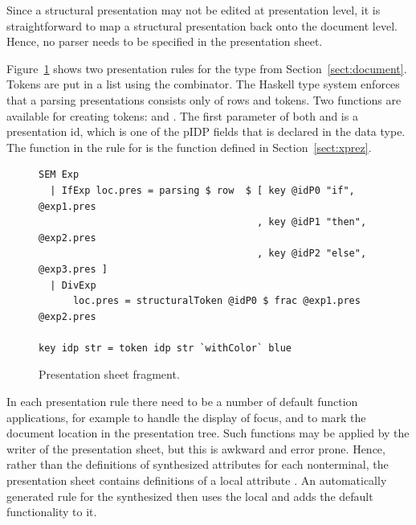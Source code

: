 \documentclass[12pt]{article}
\begin{document}
Since a structural presentation may not be edited at presentation level, it is straightforward to map a structural presentation back onto the document level. Hence, no parser needs to be specified in the presentation sheet.

Figure~\ref{fig:presentationSheet} shows two presentation rules for the type  from Section~\ref{sect:document}. Tokens are put in a list using the  combinator. The Haskell type system enforces that a parsing presentations consists only of rows and tokens. Two functions are available for creating tokens:  and . The first parameter of both  and  is a presentation id, which is one of the p{IDP} fields that is declared in the data type. The function  in the rule for  is the function defined in Section~\ref{sect:xprez}.


\begin{figure}
\begin{center}
\begin{footnotesize}
\begin{verbatim}
SEM Exp
  | IfExp loc.pres = parsing $ row  $ [ key @idP0 "if",   @exp1.pres
                                      , key @idP1 "then", @exp2.pres
                                      , key @idP2 "else", @exp3.pres ]
  | DivExp
      loc.pres = structuralToken @idP0 $ frac @exp1.pres @exp2.pres
                  
key idp str = token idp str `withColor` blue 
\end{verbatim}%
\end{footnotesize}
\caption{Presentation sheet fragment.} \label{fig:presentationSheet} 
\end{center}
\end{figure}

In each presentation rule there need to be a number of default function applications, for example to handle the display of focus, and to mark the document location in the presentation tree. Such functions may be applied by the writer of the presentation sheet, but this is awkward and error prone. Hence, rather than the definitions of synthesized attributes  for each nonterminal, the presentation sheet contains definitions of a local attribute . An automatically generated rule for the synthesized  then uses the local  and adds the default functionality to it.
\end{document}
